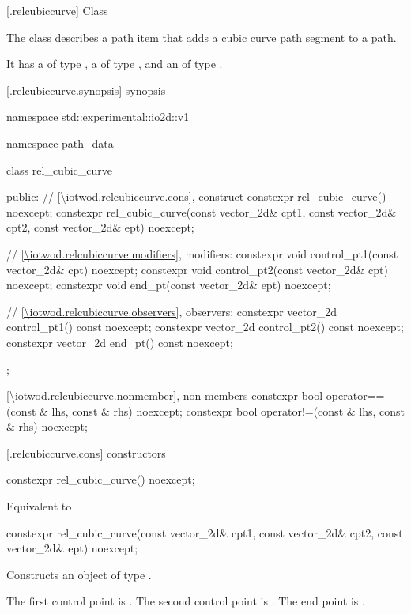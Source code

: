  [\iotwod.relcubiccurve] {Class }

\pnum
{}%
The class  describes a path item that adds a cubic \bezierlocal curve path segment to a path.

\pnum
It has a  of type , a  of type , and an  of type .

 [\iotwod.relcubiccurve.synopsis] { synopsis}

\begin{codeblock}
namespace std::experimental::io2d::v1 {
  namespace path_data {
    class rel_cubic_curve {
    public:
      // \ref{\iotwod.relcubiccurve.cons}, construct
      constexpr rel_cubic_curve() noexcept;
      constexpr rel_cubic_curve(const vector_2d& cpt1, const vector_2d& cpt2,
        const vector_2d& ept) noexcept;

      // \ref{\iotwod.relcubiccurve.modifiers}, modifiers:
      constexpr void control_pt1(const vector_2d& cpt) noexcept;
      constexpr void control_pt2(const vector_2d& cpt) noexcept;
      constexpr void end_pt(const vector_2d& ept) noexcept;

      // \ref{\iotwod.relcubiccurve.observers}, observers:
      constexpr vector_2d control_pt1() const noexcept;
      constexpr vector_2d control_pt2() const noexcept;
      constexpr vector_2d end_pt() const noexcept;
    };
    
    \ref{\iotwod.relcubiccurve.nonmember}, non-members
    constexpr bool operator==(const & lhs, const & rhs) noexcept;
    constexpr bool operator!=(const & lhs, const & rhs) noexcept;
  }
}
\end{codeblock}

 [\iotwod.relcubiccurve.cons] { constructors}

%
\begin{itemdecl}
constexpr rel_cubic_curve() noexcept;
\end{itemdecl}
\begin{itemdescr}
\pnum
\effects
Equivalent to 
\end{itemdescr}

%
\begin{itemdecl}
constexpr rel_cubic_curve(const vector_2d& cpt1, const vector_2d& cpt2,
  const vector_2d& ept) noexcept;
\end{itemdecl}
\begin{itemdescr}
\pnum
\effects
Constructs an object of type .

\pnum
The first control point is . The second control point is . The end point is .
\end{itemdescr}

